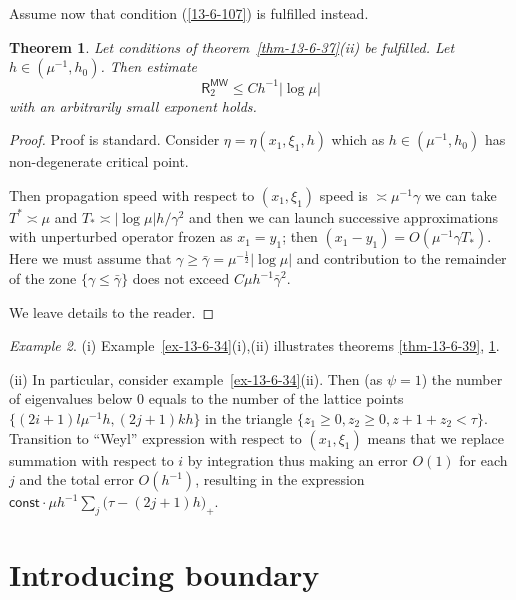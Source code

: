 \documentclass[12pt,oneside,openany,article]{memoir}
\numberwithin{equation}{chapter}
\theoremstyle{plain}
\newtheorem{theorem}{Theorem}[chapter]
\theoremstyle{definition}
\theoremstyle{remark}
\newtheorem{example}[theorem]{Example}
\numberwithin{equation}{chapter}
\begin{document}
Assume now that condition (\ref{13-6-107}) is fulfilled instead. 

\begin{theorem}\label{thm-13-6-40}
Let conditions of theorem~\ref{thm-13-6-37}(ii) be fulfilled. Let 
$h\in (\mu^{-1},h_0)$. Then  estimate 
\begin{equation}
{{\mathsf{R}}}^{{\mathsf{MW}}}_2 \le Ch^{-1} |\log \mu|
\label{13-6M-117}
\end{equation}
with an arbitrarily small exponent holds.
\end{theorem}

\begin{proof}
Proof is standard. Consider $\eta=\eta (x_1,\xi_1,h)$ which as  
$h\in (\mu^{-1},h_0)$ has non-degenerate critical point.

Then propagation speed with respect to $(x_1,\xi_1)$ speed is 
$\asymp \mu^{-1}\gamma $ we can take $T^*\asymp \mu  $ and 
$T_*\asymp |\log \mu|  h/\gamma^2$  and then we can launch successive approximations with unperturbed operator frozen as $x_1=y_1$; then $(x_1-y_1)=O(\mu^{-1}\gamma T_*)$. Here we must assume that $\gamma \ge \bar{\gamma}=\mu^{-\frac{1}{2}}|\log \mu|$ and contribution to the remainder of the zone $\{\gamma \le \bar{\gamma}\}$ does not exceed 
$C\mu h^{-1}\bar{\gamma}^2$.

We leave details to the reader. 
\end{proof}

\begin{example}\label{ex-13-6-41}
(i) Example~\ref{ex-13-6-34}(i),(ii) illustrates theorems \ref{thm-13-6-39}, \ref{thm-13-6-40}.

\medskip\noindent
(ii) In particular, consider example~\ref{ex-13-6-34}(ii). Then (as $\psi=1$) the number of eigenvalues below $0$ equals to the number of the lattice points 
$\{ (2i+1) l \mu^{-1}h ,(2j+1)k h\}$ in the triangle $\{z_1\ge 0, z_2\ge 0, z+1+z_2<\tau\}$. Transition to ``Weyl'' expression  with respect to $(x_1,\xi_1)$ means that we replace summation with respect to $i$ by integration thus making an error $O(1)$ for each $j$ and the total error $O(h^{-1})$, resulting in the expression
${{\mathsf{const}}} \cdot \mu h^{-1} \sum_j \bigl(\tau -(2j+1)h\bigr)_+$.
\end{example}

\section{Introducing boundary}
\label{sect-13-7-3-2}
\end{document}
